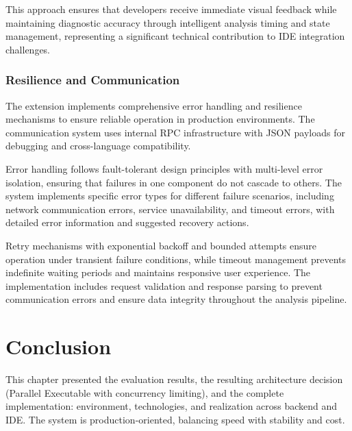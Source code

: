 \begin{spacing}{1.2}
This approach ensures that developers receive immediate visual feedback while maintaining diagnostic accuracy through intelligent analysis timing and state management, representing a significant technical contribution to IDE integration challenges.

\subsubsection{Resilience and Communication}
The extension implements comprehensive error handling and resilience mechanisms to ensure reliable operation in production environments. The communication system uses internal RPC infrastructure with JSON payloads for debugging and cross-language compatibility.

Error handling follows fault-tolerant design principles with multi-level error isolation, ensuring that failures in one component do not cascade to others. The system implements specific error types for different failure scenarios, including network communication errors, service unavailability, and timeout errors, with detailed error information and suggested recovery actions.

Retry mechanisms with exponential backoff and bounded attempts ensure operation under transient failure conditions, while timeout management prevents indefinite waiting periods and maintains responsive user experience. The implementation includes request validation and response parsing to prevent communication errors and ensure data integrity throughout the analysis pipeline.


\section*{Conclusion}
This chapter presented the evaluation results, the resulting architecture decision (Parallel Executable with concurrency limiting), and the complete implementation: environment, technologies, and realization across backend and IDE. The system is production-oriented, balancing speed with stability and cost.

\end{spacing}